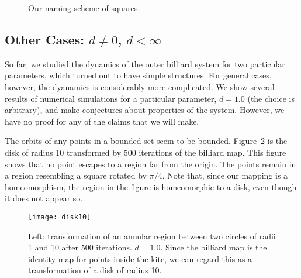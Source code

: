 \documentclass[12pt,twoside]{book}
\begin{document}
\begin{figure}[ht]
  \centering

  \caption{Our naming scheme of squares.}
  \label{fig:grid}

\end{figure}

\subsection*{Other Cases: $d \neq 0$, $d < \infty$}
So far, we studied the dynamics of the outer billiard system for two particular parameters, which turned out to have simple structures.
For general cases, however, the dyanamics is considerably more complicated.
We show several results of numerical simulations for a particular parameter, $d = 1.0$ (the choice is arbitrary), and make conjectures about properties of the system.
However, we have no proof for any of the claims that we will make.

The orbits of any points in a bounded set seem to be bounded.
Figure~\ref{fig:disk10} is the disk of radius 10 transformed by 500 iterations of the billiard map.
This figure shows that no point escapes to a region far from the origin.
The points remain in a region resembling a square rotated by $\pi/4$.
Note that, since our mapping is a homeomorphism, the region in the figure is homeomorphic to a disk, even though it does not appear so.
\begin{figure}[ht]
  \begin{center}
    \texttt{[image: disk10]}
    \caption{Left: transformation of an annular region between two circles of radii 1 and 10 after 500 iterations.
      $d = 1.0$.
      Since the billiard map is the identity map for points inside the kite, we can regard this as a transformation of a disk of radius 10.
    }
    \label{fig:disk10}
  \end{center}
\end{figure}
\end{document}
